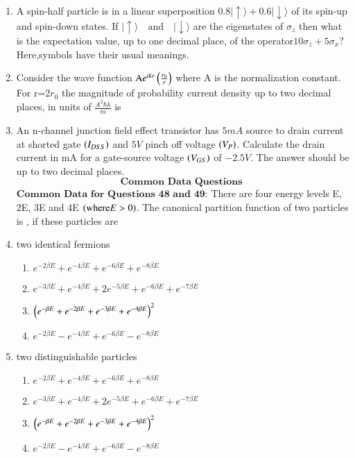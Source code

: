 \documentclass[journal]{IEEEtran}
\begin{document}
\begin{enumerate}[start=40]
\bigskip
\item A spin-half particle is in a linear superposition $0.8 \lvert \uparrow \rangle + 0.6 \lvert \downarrow \rangle$  of its spin-up and spin-down states. If $\lvert \uparrow \rangle \quad \text{and} \quad \lvert \downarrow \rangle$ are the eigenstates of $\sigma_{z}$ then what is the expectation value, up to one decimal place, of the operator$10\sigma_{z}+5\sigma_{x}?$  Here,symbols have their usual meanings.
\bigskip
\item Consider the wave function $\text{A} e^{ikr} \left(\frac{r_{0}}{r}\right)$
where A is the normalization constant. For r=2$r_{0}$ the
magnitude of probability current density up to two decimal places, in units of $\frac{A^{2}\hbar k}{m}$ is 
\bigskip
\item An n-channel junction field effect transistor has $5mA$ source to drain current at shorted gate $\left(I_{DSS}\right)$ and $5V$ pinch off voltage $\left(V_{P}\right)$. Calculate the drain current in mA for a gate-source voltage $\left(V_{GS}\right)$ of $-2.5V.$ The answer should be up to two decimal places.
\bigskip
$$\textbf{Common Data Questions }$$
$\textbf{Common Data for Questions 48 and 49:}$
\bigskip
 There are four energy levels E, 2E, 3E and 4E $\left(\text{where}E >0\right)$. The canonical partition function of two particles is , if these particles are
\item two identical fermions
\begin{enumerate}
    \item $e^{-2 \beta E}+e^{-4\beta E}+e^{-6\beta E}+e^{-8\beta E}$
    \item $e^{-3 \beta E}+e^{-4\beta E}+2e^{-5\beta E}+e^{-6\beta E}+e^{-7\beta E}$
    \item $\left(e^{- \beta E}+e^{-2\beta E}+e^{-3\beta E}+e^{-4\beta E}\right)^{2}$
    \item $e^{-2 \beta E}-e^{-4\beta E}+e^{-6\beta E}-e^{-8\beta E}$
\end{enumerate}
\bigskip
\item two distinguishable particles 
\begin{enumerate}
    \item $e^{-2 \beta E}+e^{-4\beta E}+e^{-6\beta E}+e^{-8\beta E}$
    \item $e^{-3 \beta E}+e^{-4\beta E}+2e^{-5\beta E}+e^{-6\beta E}+e^{-7\beta E}$
    \item $\left(e^{- \beta E}+e^{-2\beta E}+e^{-3\beta E}+e^{-4\beta E}\right)^{2}$
    \item $e^{-2 \beta E}-e^{-4\beta E}+e^{-6\beta E}-e^{-8\beta E}$

\end{enumerate}
\end{enumerate}
\end{document}
